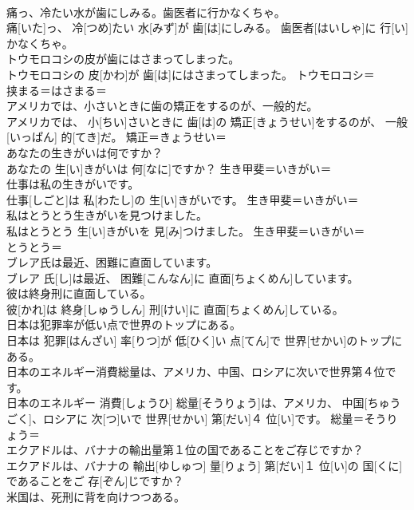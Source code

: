 \documentclass[8pt]{extreport}
\begin{document}
\begin{CJK}{UTF8}{min}
\\	痛っ、冷たい水が歯にしみる。歯医者に行かなくちゃ。	
\\	痛[いた]っ、 冷[つめ]たい 水[みず]が 歯[は]にしみる。 歯医者[はいしゃ]に 行[い]かなくちゃ。	
\\	トウモロコシの皮が歯にはさまってしまった。	
\\	トウモロコシの 皮[かわ]が 歯[は]にはさまってしまった。	トウモロコシ＝ 
\\	挟まる＝はさまる＝ 
\\	アメリカでは、小さいときに歯の矯正をするのが、一般的だ。	
\\	アメリカでは、 小[ちい]さいときに 歯[は]の 矯正[きょうせい]をするのが、 一般[いっぱん] 的[てき]だ。	矯正＝きょうせい＝ 
\\	あなたの生きがいは何ですか？	
\\	あなたの 生[い]きがいは 何[なに]ですか？	生き甲斐＝いきがい＝ 
\\	仕事は私の生きがいです。	
\\	仕事[しごと]は 私[わたし]の 生[い]きがいです。	生き甲斐＝いきがい＝ 
\\	私はとうとう生きがいを見つけました。	
\\	私はとうとう 生[い]きがいを 見[み]つけました。	生き甲斐＝いきがい＝ 
\\	とうとう＝ 
\\	ブレア氏は最近、困難に直面しています。	
\\	ブレア 氏[し]は最近、 困難[こんなん]に 直面[ちょくめん]しています。	
\\	彼は終身刑に直面している。	
\\	彼[かれ]は 終身[しゅうしん] 刑[けい]に 直面[ちょくめん]している。	
\\	日本は犯罪率が低い点で世界のトップにある。	
\\	日本は 犯罪[はんざい] 率[りつ]が 低[ひく]い 点[てん]で 世界[せかい]のトップにある。	
\\	日本のエネルギー消費総量は、アメリカ、中国、ロシアに次いで世界第４位です。	
\\	日本のエネルギー 消費[しょうひ] 総量[そうりょう]は、アメリカ、 中国[ちゅうごく]、ロシアに 次[つ]いで 世界[せかい] 第[だい]４ 位[い]です。	総量＝そうりょう＝ 
\\	エクアドルは、バナナの輸出量第１位の国であることをご存じですか？	
\\	エクアドルは、バナナの 輸出[ゆしゅつ] 量[りょう] 第[だい]１ 位[い]の 国[くに]であることをご 存[ぞん]じですか？	
\\	米国は、死刑に背を向けつつある。	

\end{CJK}
\end{document}
